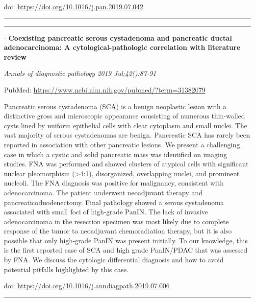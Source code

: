 \documentclass[]{article}
\begin{document}
doi: \url{https://doi.org/10.1016/j.pan.2019.07.042}

{}

{}

\begin{center}\rule{0.5\linewidth}{\linethickness}\end{center}

\begin{center}\rule{0.5\linewidth}{\linethickness}\end{center}

 - \textbf{Coexisting pancreatic serous cystadenoma and pancreatic
ductal adenocarcinoma: A cytological-pathologic correlation with
literature review}

\emph{Annals of diagnostic pathology 2019 Jul;42():87-91}

PubMed: \url{https://www.ncbi.nlm.nih.gov/pubmed/?term=31382079}

Pancreatic serous cystadenoma (SCA) is a benign neoplastic lesion with a
distinctive gross and microscopic appearance consisting of numerous
thin-walled cysts lined by uniform epithelial cells with clear cytoplasm
and small nuclei. The vast majority of serous cystadenomas are benign.
Pancreatic SCA has rarely been reported in association with other
pancreatic lesions. We present a challenging case in which a cystic and
solid pancreatic mass was identified on imaging studies. FNA was
performed and showed clusters of atypical cells with significant nuclear
pleomorphism (\textgreater{}4:1), disorganized, overlapping nuclei, and
prominent nucleoli. The FNA diagnosis was positive for malignancy,
consistent with adenocarcinoma. The patient underwent neoadjuvant
therapy and pancreaticoduodenectomy. Final pathology showed a serous
cystadenoma associated with small foci of high-grade PanIN. The lack of
invasive adenocarcinoma in the resection specimen was most likely due to
complete response of the tumor to neoadjuvant chemoradiation therapy,
but it is also possible that only high-grade PanIN was present
initially. To our knowledge, this is the first reported case of SCA and
high grade PanIN/PDAC that was assessed by FNA. We discuss the cytologic
differential diagnosis and how to avoid potential pitfalls highlighted
by this case.

doi: \url{https://doi.org/10.1016/j.anndiagpath.2019.07.006}

{}

{}

\begin{center}\rule{0.5\linewidth}{\linethickness}\end{center}
\end{document}
